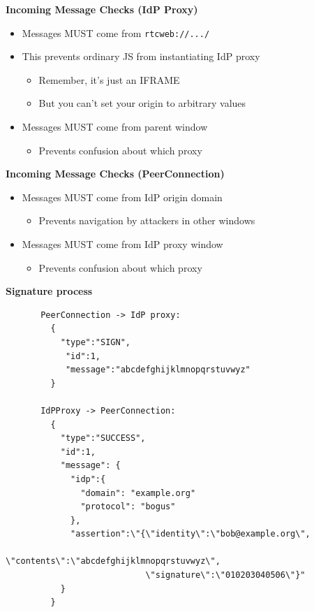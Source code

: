 \documentclass[helvetica]{seminar}
\newcommand{\heading}[1]{%
  \begin{center} 
    \large\bf 
    #1 
  \end{center} 
  \vspace{.4 in}}
\begin{document}
\begin{slide}
\heading{Incoming Message Checks (IdP Proxy)}

\begin{itemize}
\item Messages MUST come from \verb^rtcweb://.../^
\item This prevents ordinary JS from instantiating IdP proxy
  \begin{itemize}
  \item Remember, it's just an IFRAME
  \item But you can't set your origin to arbitrary values
  \end{itemize}

\item Messages MUST come from parent window
  \begin{itemize}
  \item Prevents confusion about which proxy
  \end{itemize}
\end{itemize}
\end{slide}



\begin{slide}
\heading{Incoming Message Checks (PeerConnection)}

\begin{itemize}
\item Messages MUST come from IdP origin domain
  \begin{itemize}
  \item Prevents navigation by attackers in other windows
  \end{itemize}

\item Messages MUST come from IdP proxy window
  \begin{itemize}
  \item Prevents confusion about which proxy
  \end{itemize}
\end{itemize}

\end{slide}


\begin{slide}
\heading{Signature process}

\begin{tiny}
\begin{verbatim}
       PeerConnection -> IdP proxy:
         {
           "type":"SIGN",
            "id":1,
            "message":"abcdefghijklmnopqrstuvwyz"
         }

       IdPProxy -> PeerConnection:
         {
           "type":"SUCCESS",
           "id":1,
           "message": {
             "idp":{
               "domain": "example.org"
               "protocol": "bogus"
             },
             "assertion":\"{\"identity\":\"bob@example.org\",
                            \"contents\":\"abcdefghijklmnopqrstuvwyz\",
                            \"signature\":\"010203040506\"}"
           }
         }

\end{verbatim}
\end{tiny}
\end{slide}
\end{document}
